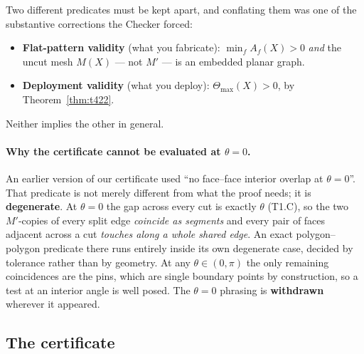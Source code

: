 \documentclass[11pt,a4paper]{article}
\theoremstyle{definition}
\newcommand{\Tmax}{\Theta_{\max}}
\newcommand{\Mprime}{M'}
\begin{document}
Two different predicates must be kept apart, and conflating them was one of the substantive
corrections the Checker forced:
\begin{itemize}\itemsep2pt
\item \textbf{Flat-pattern validity} (what you fabricate): $\min_fA_f(X)>0$ \emph{and} the
uncut mesh $M(X)$ --- not $\Mprime$ --- is an embedded planar graph.
\item \textbf{Deployment validity} (what you deploy): $\Tmax(X)>0$, by
Theorem~\ref{thm:t422}.
\end{itemize}
Neither implies the other in general.

\paragraph{Why the certificate cannot be evaluated at $\theta=0$.} An earlier version of our
certificate used ``no face--face interior overlap at $\theta=0$''. That predicate is not
merely different from what the proof needs; it is \textbf{degenerate}. At $\theta=0$ the gap
across every cut is exactly $\theta$ (T1.C), so the two $\Mprime$-copies of every split edge
\emph{coincide as segments} and every pair of faces adjacent across a cut \emph{touches along
a whole shared edge}. An exact polygon--polygon predicate there runs entirely inside its own
degenerate case, decided by tolerance rather than by geometry. At any
$\theta\in(0,\pi)$ the only remaining coincidences are the pins, which are single boundary
points by construction, so a test at an interior angle is well posed. The
$\theta=0$ phrasing is \textbf{withdrawn} wherever it appeared.

\subsection{The certificate}
\end{document}
